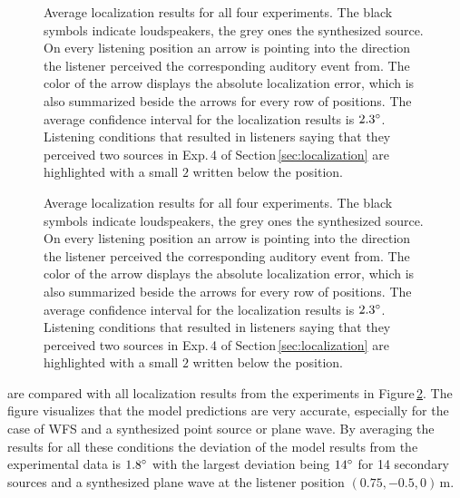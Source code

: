 \renewcommand{\thefigure}{\thechapter.\arabic{figure}a} %
\begin{figure}
    \small
    \centering
    
    \caption{Average localization results for all four experiments. The black
    symbols indicate loudspeakers, the grey ones the synthesized source. On
    every listening position an arrow is pointing into the direction the
    listener perceived the corresponding auditory event from. The color of the arrow
    displays the absolute localization error, which is also summarized beside
    the arrows for every row of positions. The average confidence interval for
    the localization results is $2.3^\circ$. Listening conditions that
    resulted in listeners saying that they perceived two sources in Exp.\,4 of
    Section\,\protect\ref{sec:localization} are
    highlighted with a small $2$ written below the position.
    }
    \label{fig:localization_results_model}
\end{figure}
%
\renewcommand{\thefigure}{\thechapter.\arabic{figure}b} %
\begin{figure}
    \ContinuedFloat %
    \small
    \centering
    
    \caption{Average localization results for all four experiments. The black
    symbols indicate loudspeakers, the grey ones the synthesized source. On
    every listening position an arrow is pointing into the direction the
    listener perceived the corresponding auditory event from. The color of the arrow
    displays the absolute localization error, which is also summarized beside
    the arrows for every row of positions. The average confidence interval for
    the localization results is $2.3^\circ$. Listening conditions that
    resulted in listeners saying that they perceived two sources in Exp.\,4 of
    Section\,\protect\ref{sec:localization} are
    highlighted with a small $2$ written below the position.
    }
    \label{fig:localization_results_model}
\end{figure}
\renewcommand{\thefigure}{\thechapter.\arabic{figure}} %
%
 are compared with all localization results
from the experiments in Figure\,\ref{fig:localization_results_model}.
The figure visualizes that the model predictions are very accurate, especially for the
case of \ac{WFS} and a synthesized point source or plane wave. By averaging the
results for all these conditions the deviation of the model results from the
experimental data is $1.8^\circ$ with the largest deviation being $14^\circ$ 
for 14 secondary sources and a synthesized plane wave at the listener position
$(0.75,-0.5,0)$\,m.

